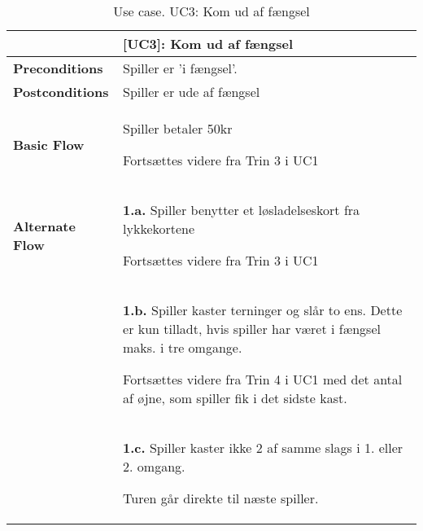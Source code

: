 \documentclass[class=article, crop=false]{standalone}
\begin{document}
    \begin{table}[H]
        \caption{Use case. UC3: Kom ud af fængsel}
        \begin{tabularx}{\textwidth}{|l|X|}
            \hline
            & \textbf{[UC3]: Kom ud af fængsel}   \\ \hline
            \textbf{Preconditions}       & Spiller er 'i fængsel'. \\ \hline
            \textbf{Postconditions}      & Spiller er ude af fængsel \\ \hline


            \textbf{Basic Flow} & \begin{tabenum}
                                      \item Spiller betaler 50kr
                                      \item Fortsættes videre fra Trin 3 i UC1
            \end{tabenum}   \\ \hline


            \textbf{Alternate Flow}  & \textbf{1.a.} Spiller benytter et løsladelseskort fra lykkekortene
                                    \begin{enumerate} \begin{tabenum}
                                                          \item Fortsættes videre fra Trin 3 i UC1
                                    \end{tabenum} \end{enumerate}
                                    \\


                                   & \textbf{1.b.} Spiller kaster terninger og slår to ens. Dette er kun tilladt, hvis spiller har været i fængsel maks. i tre omgange.
            \begin{enumerate} \begin{tabenum}
                                  \item Fortsættes videre fra Trin 4 i UC1 med det antal af øjne, som spiller fik i det sidste kast.
            \end{tabenum} \end{enumerate}
            \\

                                    & \textbf{1.c.} Spiller kaster ikke 2 af samme slags i 1. eller 2. omgang.
                                    \begin{enumerate} \begin{tabenum}
                                                          \item Turen går direkte til næste spiller.
                                    \end{tabenum} \end{enumerate}
                                    \\




\end{tabularx}
\end{table}
\end{document}
